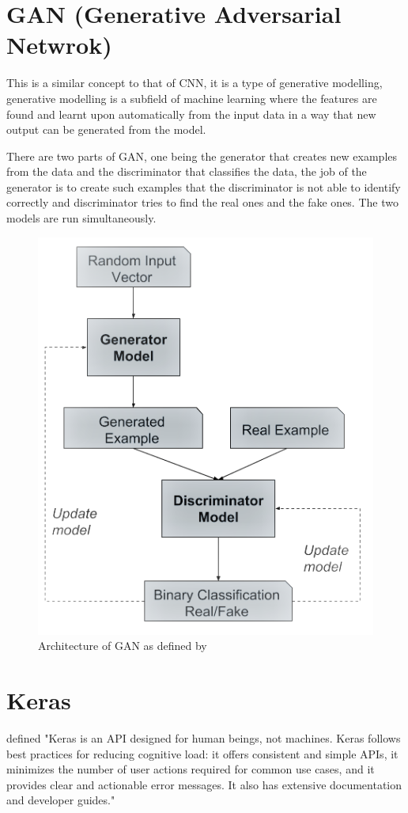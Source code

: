 \documentclass[oneside,12pt]{Classes/RoboticsLaTeX}
\begin{document}
\section{GAN (Generative Adversarial Netwrok)}

This is a similar concept to that of CNN, it is a type of generative modelling,  generative modelling  is a subfield of machine learning where the features are found and learnt upon automatically from the input data in  a way that new output can be generated from the model.

There are two parts of GAN, one being the generator that creates new examples from the data and the discriminator that classifies the data, the job of the generator is to create such examples that the discriminator is not able to identify correctly and discriminator tries to find the real ones and the fake ones. The two models are run simultaneously.

\begin{figure}[H]
  \centering
  \includegraphics[width=0.5\linewidth]{Figures/gan.png}
  \caption{Architecture of GAN as defined by \cite{brownlee_2019}}
  \label{fig:gan}
\end{figure}

\section{Keras}

\cite{keras} defined "Keras is an API designed for human beings, not machines. Keras follows best practices for reducing cognitive load: it offers consistent and simple APIs, it minimizes the number of user actions required for common use cases, and it provides clear and actionable error messages. It also has extensive documentation and developer guides."
\end{document}
